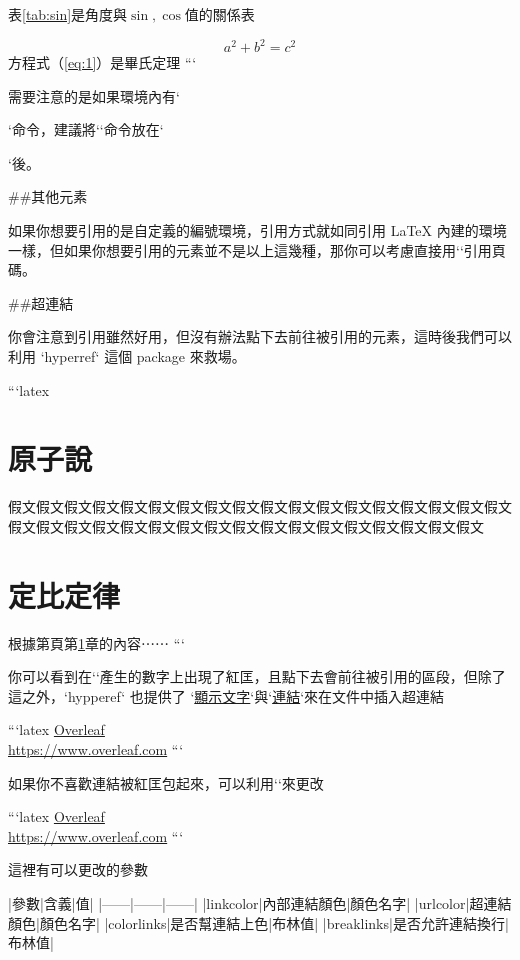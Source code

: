 \begin{markdown}
表\ref{tab:sin}是角度與$\sin, \cos$值的關係表

\begin{equation}\label{eq:1}
a^2 + b^2 = c^2
\end{equation}
方程式（\ref{eq:1}）是畢氏定理
```

需要注意的是如果環境內有`\caption{}`命令，建議將`\label{}`命令放在`\caption{}`後。

##其他元素

如果你想要引用的是自定義的編號環境，引用方式就如同引用 LaTeX 內建的環境一樣，但如果你想要引用的元素並不是以上這幾種，那你可以考慮直接用`\pageref{}`引用頁碼。

##超連結

你會注意到引用雖然好用，但沒有辦法點下去前往被引用的元素，這時後我們可以利用 `hyperref` 這個 package 來救場。

```latex
\section{原子說}\label{sec:Atomic Theory}
假文假文假文假文假文假文假文假文假文假文假文假文假文假文假文假文假文假文假文假文假文假文假文假文假文假文假文假文假文假文假文假文假文假文假文

\section{定比定律}
根據第\pageref{sec:Atomic Theory}頁第\ref{sec:Atomic Theory}章的內容⋯⋯
```

你可以看到在`\pageref{}`產生的數字上出現了紅匡，且點下去會前往被引用的區段，但除了這之外，`hypperef` 也提供了 `\href{連結}{顯示文字}`與`\url{連結}`來在文件中插入超連結

```latex
\href{https://www.overleaf.com}{Overleaf}\\
\url{https://www.overleaf.com}
```

如果你不喜歡連結被紅匡包起來，可以利用`\hypersetup{}`來更改

```latex
\hypersetup{hidelinks}
\href{https://www.overleaf.com}{Overleaf}\\
\url{https://www.overleaf.com}
```

這裡有可以更改的參數

|參數|含義|值|
|------|------|------|
|linkcolor|內部連結顏色|顏色名字|
|urlcolor|超連結顏色|顏色名字|
|colorlinks|是否幫連結上色|布林值|
|breaklinks|是否允許連結換行|布林值|
\end{markdown}
